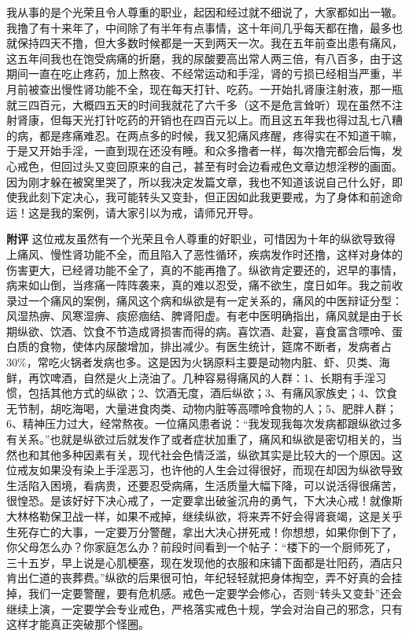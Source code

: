 \begin{case}
    我从事的是个光荣且令人尊重的职业，起因和经过就不细说了，大家都如出一辙。我撸了有十来年了，中间除了有半年有点事情，这十年间几乎每天都在撸，最多也就保持四天不撸，但大多数时候都是一天到两天一次。我在五年前查出患有痛风，这五年间我也在饱受病痛的折磨，我的尿酸要高出常人两三倍，有八百多，由于这期间一直在吃止疼药，加上熬夜、不经常运动和手淫，肾的亏损已经相当严重，半月前被查出慢性肾功能不全，现在每天打针、吃药。一开始扎肾康注射液，那一瓶就三四百元，大概四五天的时间我就花了六千多（这不是危言耸听）现在虽然不注射肾康，但每天光打针吃药的开销也在四百元以上。而且这五年我也得过乱七八糟的病，都是疼痛难忍。在两点多的时候，我又犯痛风疼醒，疼得实在不知道干嘛，于是又开始手淫，一直到现在还没有睡。和众多撸者一样，每次撸完都会后悔，发心戒色，但回过头又变回原来的自己，甚至有时会边看戒色文章边想淫秽的画面。因为刚才躲在被窝里哭了，所以我决定发篇文章，我也不知道该说自己什么好，即使我此刻下定决心，我可能转头又变卦，但正因如此我更要戒，为了身体和前途命运！这是我的案例，请大家引以为戒，请师兄开导。

    \textbf{附评} 这位戒友虽然有一个光荣且令人尊重的好职业，可惜因为十年的纵欲导致得上痛风、慢性肾功能不全，而且陷入了恶性循环，疾病发作时还撸，这样对身体的伤害更大，已经肾功能不全了，真的不能再撸了。纵欲肯定要还的，迟早的事情，病来如山倒，当疼痛一阵阵袭来，真的难以忍受，痛不欲生，度日如年。我之前收录过一个痛风的案例，痛风这个病和纵欲是有一定关系的，痛风的中医辩证分型：风湿热痹、风寒湿痹、痰瘀痼结、脾肾阳虚。有老中医明确指出，痛风就是由于长期纵欲、饮酒、饮食不节造成肾损害而得的病。喜饮酒、赴宴，喜食富含嘌呤、蛋白质的食物，使体内尿酸增加，排出减少。有医生统计，筵席不断者，发病者占 30\%，常吃火锅者发病也多。这是因为火锅原料主要是动物内脏、虾、贝类、海鲜，再饮啤酒，自然是火上浇油了。几种容易得痛风的人群：1、长期有手淫习惯，包括其他方式的纵欲；2、饮酒无度，酒后纵欲；3、有痛风家族史；4、饮食无节制，胡吃海喝，大量进食肉类、动物内脏等高嘌呤食物的人；5、肥胖人群；6、精神压力过大，经常熬夜。一位痛风患者说：“我发现我每次发病都跟纵欲过多有关系。”也就是纵欲过后就发作了或者症状加重了，痛风和纵欲是密切相关的，当然也和其他多种因素有关，现代社会色情泛滥，纵欲其实是比较大的一个原因。这位戒友如果没有染上手淫恶习，也许他的人生会过得很好，而现在却因为纵欲导致生活陷入困境，看病贵，还要忍受病痛，生活质量大幅下降，可以说活得很痛苦，很惶恐。是该好好下决心戒了，一定要拿出破釜沉舟的勇气，下大决心戒！就像斯大林格勒保卫战一样，如果不戒掉，继续纵欲，将来弄不好会得肾衰竭，这是关乎生死存亡的大事，一定要万分警醒，拿出大决心拼死戒！你想想，如果你倒下了，你父母怎么办？你家庭怎么办？前段时间看到一个帖子：“楼下的一个厨师死了，三十五岁，早上说是心肌梗塞，现在发现他的衣服和床铺下面都是壮阳药，酒店只肯出仁道的丧葬费。”纵欲的后果很可怕，年纪轻轻就把身体掏空，弄不好真的会挂掉，我们一定要警醒，要有危机感。戒色一定要学会修心，否则“转头又变卦”还会继续上演，一定要学会专业戒色，严格落实戒色十规，学会对治自己的邪念，只有这样才能真正突破那个怪圈。
\end{case}


